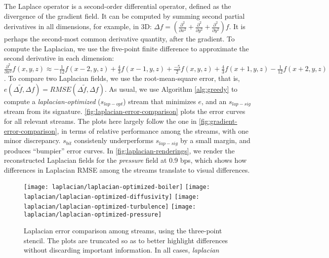 The Laplace operator is a second-order differential operator, defined as the divergence of the
gradient field. It can be computed by summing second partial derivatives in all dimensions, for
example, in 3D: $\Delta
f=(\frac{{\partial}^2}{\partial{x^2}}+\frac{{\partial}^2}{\partial{y^2}}+\frac{{\partial}^2}{\partial{y^2}})f$.
It is perhaps the second-most common derivative quantity, after the gradient. To compute the
Laplacian, we use the five-point finite difference to approximate the second derivative in each
dimension: $\frac{{\partial}^2}{\partial{x^2}}f(x,y,z) \approx
-\frac{1}{12}f(x-2,y,z)+\frac{4}{3}f(x-1,y,z)+\frac{-5}{2}f(x,y,z)+\frac{4}{3}f(x+1,y,z)-\frac{1}{12}f(x+2,y,z)$.
To compare two Laplacian fields, we use the root-mean-square error, that is, $e(\Delta
\tilde{f},\Delta f)=RMSE(\Delta \tilde{f},\Delta f)$. As usual, we use Algorithm \autoref{alg:greedy}
to compute a \emph{laplacian-optimized} ($s_{lap-opt}$) stream that minimizes $e$, and an
$s_{lap-sig}$ stream from its signature. \autoref{fig:laplacian-error-comparison} plots the error
curves for all relevant streams. The plots here largely follow the one in
\autoref{fig:gradient-error-comparison}, in terms of relative performance among the streams, with
one minor discrepancy. $s_{bit}$ consistenly underperforms $s_{lap-sig}$ by a small margin, and
produces ``bumpier'' error curves. In \autoref{fig:laplacian-renderings}, we render the
reconstructed Laplacian fields for the \emph{pressure} field at 0.9 bps, which shows how differences
in Laplacian RMSE among the streams translate to visual differences.

\begin{figure}[h]
	\centering
	{\texttt{[image: laplacian/laplacian-optimized-boiler]}}
	{\texttt{[image: laplacian/laplacian-optimized-diffusivity]}}
	{\texttt{[image: laplacian/laplacian-optimized-turbulence]}}
	{\texttt{[image: laplacian/laplacian-optimized-pressure]}}
	\caption{Laplacian error comparison among streams, using the three-point stencil. The plots are
	truncated so as to better highlight differences without discarding important information. In all
	cases, \emph{laplacian}}\label{fig:laplacian-error-comparison}
\end{figure}

